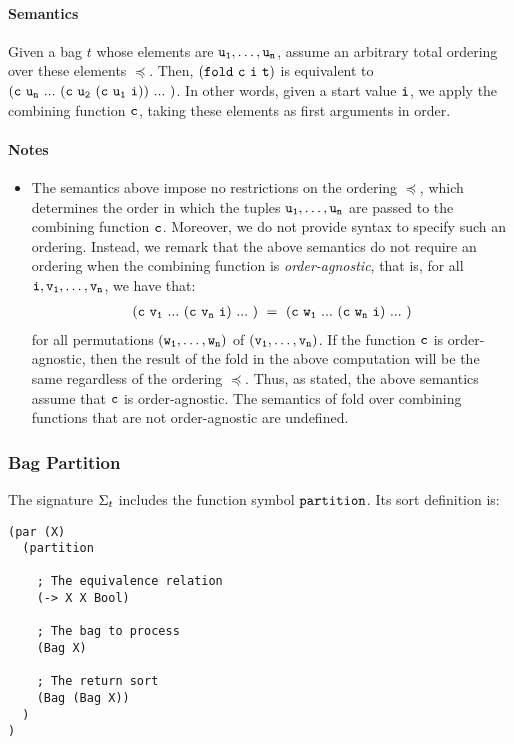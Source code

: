 \documentclass[english,a4paper,10pt]{article}
\begin{document}
\paragraph{Semantics}
Given a bag $t$ whose elements are ${\tt u_1}, \ldots, {\tt u_n}$,
assume an arbitrary total ordering over these elements $\preceq$.
Then, ${\tt (fold\ c\ i\ t)}$ is equivalent to
$
{\tt 
(c\ u_n\ ...\ (c\ u_2\ (c\ u_1\ i))\ ...\ )
}
$.
In other words, given a start value ${\tt i}$,
we apply the combining function ${\tt c}$, taking these elements
as first arguments in order.

\paragraph{Notes}
\begin{itemize}
\item
The semantics above impose no restrictions on the ordering $\preceq$,
which determines the order in which the tuples ${\tt u_1}, \ldots, {\tt u_n}$
are passed to the combining function ${\tt c}$.
Moreover, 
we do not provide syntax to specify such an ordering.
Instead, 
we remark that the above semantics
do not require an ordering when the combining function is
\emph{order-agnostic},
that is, for all ${\tt i}, {\tt v_1}, \ldots, {\tt v_n}$,
we have that:
\begin{eqnarray*}
\syntax{(c\ v_1\ ...\ (c\ v_n\ i)\ ...\ )\ =\ (c\ w_1\ ...\ (c\ w_n\ i)\ ...\ )}
\end{eqnarray*}
for all permutations $( {\tt w_1}, \ldots, {\tt w_n} )$ of $( {\tt v_1}, \ldots, {\tt v_n} )$.
If the function ${\tt c}$ is order-agnostic,
then the result of the fold in the above computation will be the same regardless
of the ordering $\preceq$.
Thus, as stated, the above semantics assume that ${\tt c}$ is order-agnostic.
The semantics
of fold over combining functions that are not order-agnostic are undefined.
\end{itemize}

\subsubsection{Bag Partition}
The signature $\Sigma_{t}$ includes 
the function symbol ${\tt partition}$. Its sort definition is:

\begin{verbatim}
(par (X)
  (partition
    
    ; The equivalence relation
    (-> X X Bool)
  
    ; The bag to process
    (Bag X)
    
    ; The return sort
    (Bag (Bag X))
  )
)
\end{verbatim}
\end{document}
